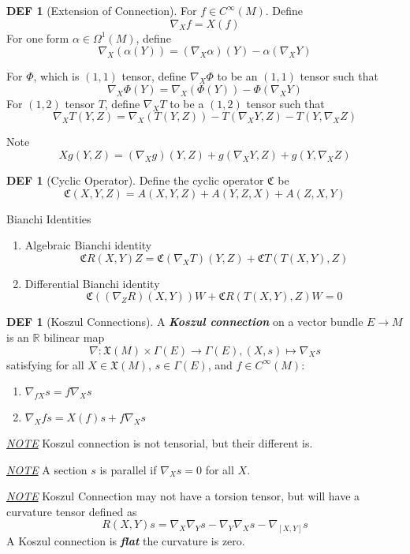 \documentclass[twocolumn]{article}
\renewcommand{\emph}[1]{\textbf{\textit{#1}}}
\newcommand{\X}{\mathfrak{X}}
\newcommand{\n}{\nabla}
\newcommand{\R}{\mathbb{R}}
\newcommand{\C}{C^{\infty}}
\newcommand{\CY}{\mathfrak{C}}
\newcommand{\G}{\Gamma}
\newcommand{\N}{\textit{\underline{NOTE} }}
\newcommand{\W}{\Omega}
\theoremstyle{definition}
\newtheorem{defi}[thm]{DEF}
\begin{document}
\begin{defi}[Extension of Connection]
	For $f \in \C(M)$. Define 
	$$
		\n_X f = X(f)
	$$
	For one form $\alpha \in \W^1(M)$, define 
	$$
		\n_X(\alpha (Y)) = (\n_X \alpha)(Y) - \alpha(\n_X Y)
	$$

	For $\Phi$, which is $(1,1)$ tensor, define $\n_X \Phi$ to be an $(1,1)$ tensor such that 
	$$
		\n_X \Phi(Y) = \n_X(\Phi(Y)) - \Phi(\n_X Y)
	$$
	For $(1,2)$ tensor $T$, define $\n_X T$ to be a $(1,2)$ tensor such that
	$$
		\n_X T(Y, Z) = \n_X(T(Y, Z)) - T(\n_X Y, Z) - T(Y, \n_X Z)
	$$

	Note 
	$$
		X g(Y, Z) = (\n_X g)(Y, Z) + g(\n_X Y, Z) + g(Y, \n_X Z)
	$$
\end{defi}

\begin{defi}[Cyclic Operator]
	Define the cyclic operator $\CY$ be 
	$$
		\CY(X, Y, Z) = A(X, Y, Z) + A(Y, Z, X) + A(Z, X, Y)
	$$
\end{defi}

\begin{fthm}{Bianchi Identities}{}
	\begin{enumerate}
		\item Algebraic Bianchi identity 
			$$
				\CY R(X, Y) Z = \CY(\n_X T)(Y, Z) + \CY T (T (X, Y),Z)
			$$
		\item Differential Bianchi identity 
			$$
				\CY((\n_Z R)(X, Y))W + \CY R(T(X, Y), Z)W = 0
			$$
	\end{enumerate}
\end{fthm}

\begin{defi}[Koszul Connections]
	A \emph{Koszul connection} on a vector bundle $E \rightarrow  M$ is an $\R$ bilinear map 
	$$
		\n: \X (M) \times \G(E) \to \G (E), (X,s) \mapsto \n_X s
	$$
	satisfying for all $X \in \X(M)$, $s \in \G(E)$, and $f \in \C(M)$: 
	\begin{enumerate}
		\item $\n_{fX} s = f \n_X s$
		\item $\n_{X} fs = X(f) s + f \n_X s$
	\end{enumerate}

\end{defi}

\N Koszul connection is not tensorial, but their different is.

\N A section $s$ is parallel if $\n_X s = 0$ for all $X$.

\N Koszul Connection may not have a torsion tensor, but will have a curvature tensor defined as 
$$
	R(X, Y)s = \n_X \n_Y s - \n_Y \n_X s - \n_{[X, Y]} s
$$
A Koszul connection is \emph{flat} the curvature is zero.
\end{document}
